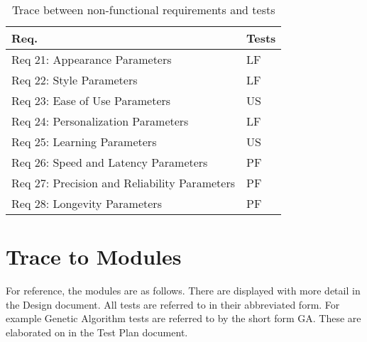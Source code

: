 \documentclass[12pt, titlepage]{article}
\begin{document}
\begin{table}[H]
\centering
\begin{tabular}{p{} p{}}
\toprule
\textbf{Req.} & \textbf{Tests}\\
\midrule
Req 21: Appearance Parameters & LF\\
Req 22: Style Parameters & LF\\
Req 23: Ease of Use Parameters & US\\
Req 24: Personalization Parameters & LF\\
Req 25: Learning Parameters & US\\
Req 26: Speed and Latency Parameters & PF\\
Req 27: Precision and Reliability Parameters & PF\\
Req 28: Longevity Parameters & PF\\
\bottomrule
\end{tabular}
\caption{Trace between non-functional requirements and tests}
\label{TblRT2}
\end{table}

\section{Trace to Modules}	

For reference, the modules are as follows. There are displayed with more detail 
in the Design document. All tests are referred to in their abbreviated form. For 
example Genetic Algorithm tests are referred to by the short form GA. These are 
elaborated on in the Test Plan document.
\end{document}
